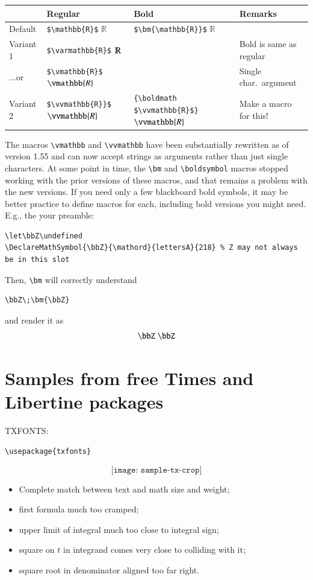 \documentclass[11pt]{article}
\theoremstyle{oldplain}
\theoremstyle{plain}
\begin{document}
\begin{center}
  \begin{tabular}{@{} llll @{}}
    \toprule
     & Regular & Bold & Remarks \\ 
    \midrule
Default  & \verb|$\mathbb{R}$| $\mathbb{R}$& \verb|$\bm{\mathbb{R}}$| $\bm{\mathbb{R}}$\\ 
Variant 1     & \verb|$\varmathbb{R}$| $\varmathbb{R}$ &  & Bold is same as regular \\ 
$\dots$or     & \verb|$\vmathbb{R}$| $\vmathbb{R}$ &  & Single char.\ argument\\ 
Variant 2 & \verb|$\vvmathbb{R}}$| $\vvmathbb{R}$& \verb|{\boldmath $\vvmathbb{R}$}| {\boldmath $\vvmathbb{R}$} & Make a macro for this! \\ 
    \bottomrule
  \end{tabular}
\end{center}
The macros \verb|\vmathbb| and \verb|\vvmathbb| have been substantially rewritten as of version 1.55 and can now accept strings as arguments rather than just single characters. At some point in time, the \verb|\bm| and \verb|\boldsymbol| macros stopped working with the prior versions of these macros, and that remains a problem with the new versions. If you need only a few blackboard bold symbols, it may be better practice to define macros for each, including bold versions you might need. E.g., the your preamble:
\begin{verbatim}
\let\bbZ\undefined
\DeclareMathSymbol{\bbZ}{\mathord}{lettersA}{218} % Z may not always be in this slot
\end{verbatim}
Then, \verb|\bm| will correctly understand
\begin{verbatim}
\bbZ\;\bm{\bbZ}
\end{verbatim}
and render it as
\[\bbZ\;\bm{\bbZ}\]

\section{Samples from free Times and Libertine packages}
\textsc{TXFONTS:}\\
\begin{verbatim}
\usepackage{txfonts}
\end{verbatim}
\[\texttt{[image: sample-tx-crop]}\]
\begin{itemize}
\item
Complete match between text and math size and weight;
\item first formula much too cramped;
\item upper limit of integral much too close to integral sign;
\item square on $t$ in integrand comes very close to colliding with it;
\item square root in denominator aligned too far right.
\end{itemize}
\end{document}
